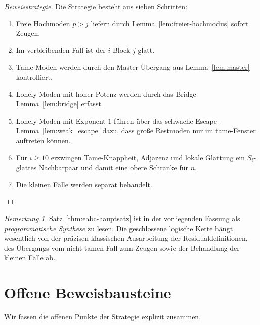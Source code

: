 \documentclass[12pt,a4paper]{article}
\theoremstyle{plain}
\theoremstyle{definition}
\theoremstyle{remark}
\newtheorem{remark}[theorem]{Bemerkung}
\begin{document}
	\begin{proof}[Beweisstrategie]
		Die Strategie besteht aus sieben Schritten:
		\begin{enumerate}[label=\arabic*)]
			\item Freie Hochmoden \(p>j\) liefern durch Lemma~\ref{lem:freier-hochmodus} sofort Zeugen.
			\item Im verbleibenden Fall ist der \(i\)-Block \(j\)-glatt.
			\item Tame-Moden werden durch den Master-Übergang aus Lemma~\ref{lem:master} kontrolliert.
			\item Lonely-Moden mit hoher Potenz werden durch das Bridge-Lemma~\ref{lem:bridge} erfasst.
			\item Lonely-Moden mit Exponent \(1\) führen über das schwache Escape-Lemma~\ref{lem:weak_escape} dazu, dass große Restmoden nur im tame-Fenster auftreten können.
			\item Für \(i\ge10\) erzwingen Tame-Knappheit, Adjazenz und lokale Glättung ein \(S_i\)-glattes Nachbarpaar und damit eine obere Schranke für \(n\).
			\item Die kleinen Fälle werden separat behandelt.
		\end{enumerate}
	\end{proof}
	
	\begin{remark}
		Satz~\ref{thm:eabc-hauptsatz} ist in der vorliegenden Fassung als \emph{programmatische Synthese} zu lesen. Die geschlossene logische Kette hängt wesentlich von der präzisen klassischen Ausarbeitung der Residualdefinitionen, des Übergangs vom nicht-tamen Fall zum Zeugen sowie der Behandlung der kleinen Fälle ab.
	\end{remark}
	
	\section{Offene Beweisbausteine}
	
	Wir fassen die offenen Punkte der Strategie explizit zusammen.
	
\end{document}
